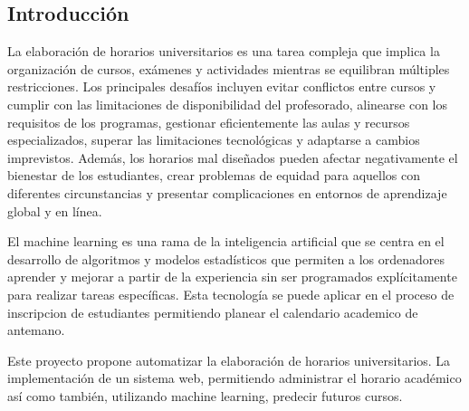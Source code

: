 \subsection{Introducción}

La elaboración de horarios universitarios es una tarea compleja que implica la organización de cursos, exámenes y actividades mientras se equilibran múltiples restricciones.
Los principales desafíos incluyen evitar conflictos entre cursos y cumplir con las limitaciones de disponibilidad del profesorado, alinearse con los requisitos de los programas, gestionar eficientemente las aulas y recursos especializados, superar las limitaciones tecnológicas y adaptarse a cambios imprevistos.
Además, los horarios mal diseñados pueden afectar negativamente el bienestar de los estudiantes, crear problemas de equidad para aquellos con diferentes circunstancias y presentar complicaciones en entornos de aprendizaje global y en línea.

El machine learning es una rama de la inteligencia artificial que se centra en el desarrollo de algoritmos y modelos estadísticos que permiten a los ordenadores aprender y mejorar a partir de la experiencia sin ser programados explícitamente para realizar tareas específicas.
Esta tecnología se puede aplicar en el proceso de inscripcion de estudiantes permitiendo planear el calendario academico de antemano.

Este proyecto propone automatizar la elaboración de horarios universitarios.
La implementación de un sistema web, permitiendo administrar el horario académico así como también, utilizando machine learning, predecir futuros cursos.
